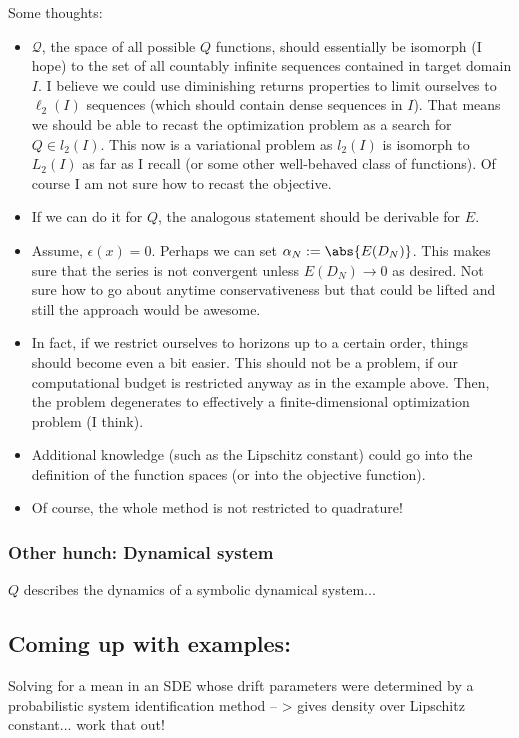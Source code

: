 Some thoughts:
\begin{itemize}
	\item $\mathcal Q$, the space of all possible $Q$ functions, should essentially be isomorph (I hope) to the set of all countably infinite sequences contained in target domain $I$. I believe we could use diminishing returns properties to limit ourselves to $\ell_2(I)$ sequences (which should contain dense sequences in $I$). That means we should be able to recast the optimization problem as a search for $Q \in l_2(I) $. This now is a variational problem as $l_2(I) $ is isomorph to $L_2(I)$ as far as I recall (or some other well-behaved class of functions). Of course I am not sure how to recast the objective. 
	\item If we can do it for $Q$, the analogous statement should be derivable for $E$. 
	\item Assume, $\epsilon(x) = 0$. Perhaps we can set $\alpha_N : = \abs{E(D_N)}$. This makes sure that the series is not convergent unless $E(D_N) \to 0$ as desired. Not sure how to go about anytime conservativeness
	but that could be lifted and still the approach would be awesome.
	
	\item In fact, if we restrict ourselves to horizons up to a certain order, things should become even a bit easier. This should not be a problem, if our computational budget is restricted anyway as in the example above. Then, the problem degenerates to effectively a finite-dimensional optimization problem (I think).
	\item Additional knowledge (such as the Lipschitz constant) could go into the definition of the function spaces (or into the objective function).
	\item Of course, the whole method is not restricted to quadrature!
	 
\end{itemize}

\subsubsection{Other hunch: Dynamical system}
$Q$ describes the dynamics of a symbolic dynamical system...

\subsection{Coming up with examples:}
Solving for a mean in an SDE whose drift parameters were determined by a probabilistic system identification method -- > gives density over Lipschitz constant... work that out!



